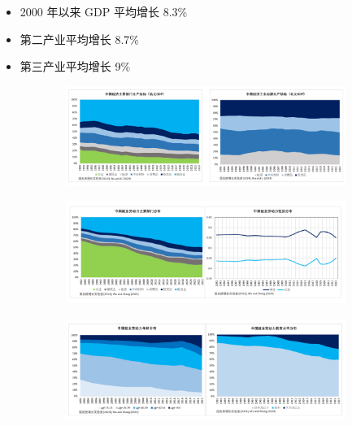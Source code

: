 \begin{itemize}
    \item 2000 年以来 GDP 平均增长 8.3\%
    \item 第二产业平均增长 8.7\%
    \item 第三产业平均增长 9\%
\end{itemize}

\newpage

\begin{figure}[htbp] %
  \centering
  \begin{subfigure}[b]{0.9\textwidth}
    \includegraphics[width=\linewidth]{image/中国经济主要行业构成.png}
    \label{fig:industry}
  \end{subfigure}
\begin{subfigure}[b]{0.9\textwidth}
    \includegraphics[width=\linewidth]{image/中国就业劳动力行业分布.png}
    \label{fig:labor_industry}
  \end{subfigure}
\begin{subfigure}[b]{0.9\textwidth}
    \includegraphics[width=\linewidth]{image/中国就业劳动力年龄与教育.png} %
    \label{fig:labor_age_edu}
  \end{subfigure}
  \label{fig:combined}
\end{figure}
\newpage

